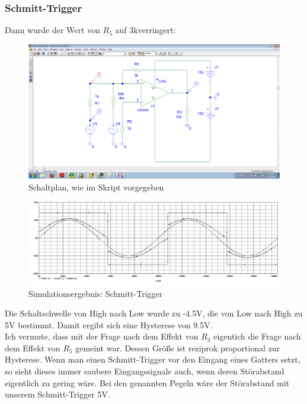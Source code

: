 \subsubsection*{Schmitt-Trigger}
Dann wurde der Wert von $ R_5 $ auf 3k\Ohm verringert:
\begin{figure}[H]
	\centering
	\includegraphics[width=\linewidth]{versuch6/spice/schem644.png}
	\caption{Schaltplan, wie im Skript vorgegeben}
\end{figure}
\begin{figure}[H]
	\centering
	\includegraphics[width=\linewidth]{versuch6/spice/644.png}
	\caption{Simulationsergebnis: Schmitt-Trigger}
\end{figure}
Die Schaltschwelle von High nach Low wurde zu -4.5V, die von Low nach High zu 5V bestimmt. Damit ergibt sich eine Hysterese von 9.5V.\\
Ich vermute, dass mit der Frage nach dem Effekt von $ R_3 $ eigentich die Frage nach dem Effekt von $ R_5 $ gemeint war. Dessen Größe ist reziprok proportional zur Hysterese. Wenn man einen Schmitt-Trigger vor den Eingang eines Gatters setzt, so sieht dieses immer saubere Eingangssignale auch, wenn deren Störabstand eigentlich zu gering wäre.
Bei den genannten Pegeln wäre der Störabstand mit unserem Schmitt-Trigger 5V.

